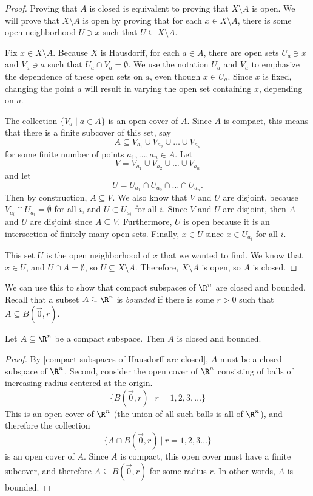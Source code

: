\documentclass[noname]{notes}
\begin{document}
\begin{proof}
	Proving that $A$ is closed is equivalent to proving that $X \setminus A$ is open. We will prove that $X \setminus A$ is open by proving that for each $x \in X \setminus A$, there is some open neighborhood $U \ni x$ such that $U \subseteq X \setminus A$. 
	
	Fix $x \in X \setminus A$. Because $X$ is Hausdorff, for each $a \in A$, there are open sets $U_a \ni x$ and $V_a \ni a$ such that $U_a \cap V_a = \emptyset$. We use the notation $U_a$ and $V_a$ to emphasize the dependence of these open sets on $a$, even though $x \in U_a$. Since $x$ is fixed, changing the point $a$ will result in varying the open set containing $x$, depending on $a$. 
	
	The collection $\big\{V_a \mid a \in A\big\}$ is an open cover of $A$. Since $A$ is compact, this means that there is a finite subcover of this set, say 
	\[
		A \subseteq V_{a_1} \cup V_{a_2} \cup \ldots \cup V_{a_n} 
	\]
	for some finite number of points $a_1, \ldots, a_n \in A$. Let
	\[
		V = V_{a_1} \cup V_{a_2} \cup \ldots \cup V_{a_n}
	\]
	and let 
	\[
		U = U_{a_1} \cap U_{a_2} \cap \ldots \cap U_{a_n}. 
	\]
	Then by construction, $A \subseteq V$. We also know that $V$ and $U$ are disjoint, because $V_{a_i} \cap U_{a_i} = \emptyset$ for all $i$, and $U \subset U_{a_i}$ for all $i$. Since $V$ and $U$ are disjoint, then $A$ and $U$ are disjoint since $A \subseteq V$. Furthermore, $U$ is open because it is an intersection of finitely many open sets. Finally, $x \in U$ since $x \in U_{a_i}$ for all $i$. 
	
	This set $U$ is the open neighborhood of $x$ that we wanted to find. We know that $x \in U$, and $U \cap A = \emptyset$, so $U \subseteq X \setminus A$. Therefore, $X \setminus A$ is open, so $A$ is closed. 
\end{proof}

We can use this to show that compact subspaces of $\R^n$ are closed and bounded. Recall that a subset $A \subseteq \R^n$ is \emph{bounded} if there is some $r > 0$ such that $A \subseteq B(\vec{0},r)$. 

\begin{corollary}
	\label{compact subsets of R^n are closed and bounded}
	Let $A \subseteq \R^n$ be a compact subspace. Then $A$ is closed and bounded. 
\end{corollary}

\begin{proof}
	By \cref{compact subspaces of Hausdorff are closed}, $A$ must be a closed subspace of $\R^n$. Second, consider the open cover of $\R^n$ consisting of balls of increasing radius centered at the origin. 
	\[
		\Big\{ B(\vec{0}, r) \ \Big\vert\ r = 1, 2, 3, \ldots\Big\}
	\]
	This is an open cover of $\R^n$ (the union of all such balls is all of $\R^n$), and therefore the collection 
	\[
		\Big\{ A \cap B(\vec{0}, r) \ \Big\vert\ r = 1, 2, 3\ldots \Big\}
	\]
	is an open cover of $A$. Since $A$ is compact, this open cover must have a finite subcover, and therefore $A \subseteq B(\vec{0}, r)$ for some radius $r$. In other words, $A$ is bounded. 
\end{proof}
\end{document}
